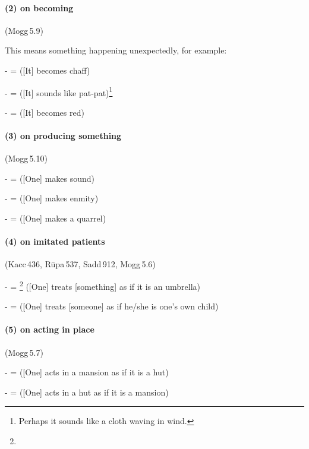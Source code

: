 \paragraph*{(2)  on becoming} (Mogg\,5.9)\par
This means something happening unexpectedly, for example:\par
-  =  ([It] becomes chaff)\par
-  =  ([It] sounds like pat-pat)\footnote{Perhaps it sounds like a cloth waving in wind.}\par
-  =  ([It] becomes red)\par

\paragraph*{(3)  on producing something} (Mogg\,5.10)\par
-  =  ([One] makes sound)\par
-  =  ([One] makes enmity)\par
-  =  ([One] makes a quarrel)\par

\paragraph*{(4)  on imitated patients} (Kacc\,436, R\=upa\,537, Sadd\,912, Mogg\,5.6)\label{pacca:iiya}\par
-  = \footnote{} ([One] treats [something] as if it is an umbrella)\par
-  =  ([One] treats [someone] as if he/she is one's own child)\par

\paragraph*{(5)  on acting in place} (Mogg\,5.7)\par
-  =  ([One] acts in a mansion as if it is a hut)\par
-  =  ([One] acts in a hut as if it is a mansion)\par

